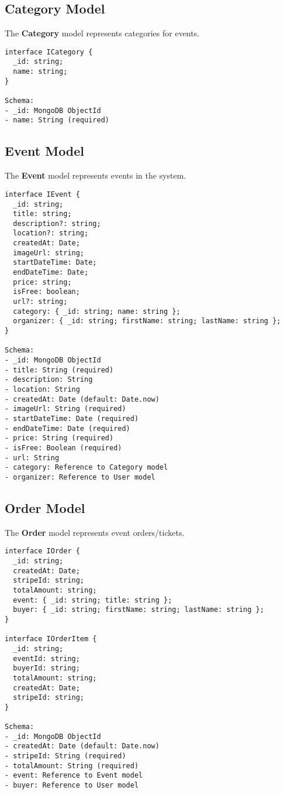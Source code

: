 \subsection{Category Model}

The \textbf{Category} model represents categories for events.

\begin{lstlisting}[style=typescript, caption={Category Model Interface}]
interface ICategory {
  _id: string;
  name: string;
}

Schema:
- _id: MongoDB ObjectId
- name: String (required)
\end{lstlisting}


\subsection{Event Model}

The \textbf{Event} model represents events in the system.

\begin{lstlisting}[style=typescript, caption={Event Model Interface}]
interface IEvent {
  _id: string;
  title: string;
  description?: string;
  location?: string;
  createdAt: Date;
  imageUrl: string;
  startDateTime: Date;
  endDateTime: Date;
  price: string;
  isFree: boolean;
  url?: string;
  category: { _id: string; name: string };
  organizer: { _id: string; firstName: string; lastName: string };
}

Schema:
- _id: MongoDB ObjectId
- title: String (required)
- description: String
- location: String
- createdAt: Date (default: Date.now)
- imageUrl: String (required)
- startDateTime: Date (required)
- endDateTime: Date (required)
- price: String (required)
- isFree: Boolean (required)
- url: String
- category: Reference to Category model
- organizer: Reference to User model
\end{lstlisting}


\subsection{Order Model}

The \textbf{Order} model represents event orders/tickets.

\begin{lstlisting}[style=typescript, caption={Order Model Interface}]
interface IOrder {
  _id: string;
  createdAt: Date;
  stripeId: string;
  totalAmount: string;
  event: { _id: string; title: string };
  buyer: { _id: string; firstName: string; lastName: string };
}

interface IOrderItem {
  _id: string;
  eventId: string;
  buyerId: string;
  totalAmount: string;
  createdAt: Date;
  stripeId: string;
}

Schema:
- _id: MongoDB ObjectId
- createdAt: Date (default: Date.now)
- stripeId: String (required)
- totalAmount: String (required)
- event: Reference to Event model
- buyer: Reference to User model
\end{lstlisting}

